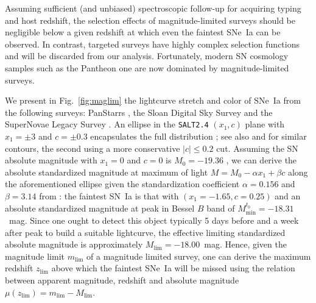 \documentclass[]{aa}
\begin{document}
Assuming sufficient (and unbiased) spectroscopic follow-up for acquiring typing
and host redshift, the selection effects of magnitude-limited surveys should be
negligible below a given redshift at which even the faintest SNe~Ia can be
observed. In contrast, targeted surveys have highly complex selection functions
and will be discarded from our analysis. Fortunately, modern SN cosmology
samples such as the Pantheon one are now dominated by magnitude-limited surveys.

We present in Fig.~\ref{fig:maglim} the lightcurve stretch and color of SNe~Ia
from the following surveys: PanStarrs \citep[PS1][]{rest2014}, the Sloan Digital
Sky Survey \citep[SDSS][]{frieman2008} and the SuperNovae Legacy Survey
\citep[SNLS][]{astier2006}. An ellipse in the \textsc{\texttt{SALT2.4}} $(x_1,
c)$ plane with $x_1 = \pm 3$ and $c = \pm 0.3$ encapsulates the full
distribution \citep{guy2007,betoule2014}; see also \citet{bazin2011} and
\citet{campbell2013} for similar contours, the second using a more conservative
$|c| \leq 0.2$ cut. Assuming the SN absolute magnitude with $x_1=0$ and $c=0$ is
$M_0=-19.36$ \citep{kessler2009,scolnic2014}, we can derive the absolute
standardized magnitude at maximum of light $M = M_0 - \alpha x_1 + \beta c$
along the aforementioned ellipse given the standardization coefficient
$\alpha=0.156$ and $\beta=3.14$ from \cite{scolnic2018a}: the faintest SN~Ia is
that with $(x_1=-1.65, c=0.25)$ and an absolute standardized magnitude at peak
in Bessel $B$ band of $M^{t_0}_{\min} = -18.31$~mag. Since one ought to detect
this object typically 5 days before and a week after peak to build a suitable
lightcurve, the effective limiting standardized absolute magnitude is
approximately $M_{\lim} = -18.00$~mag. Hence, given the magnitude limit
$m_{\lim}$ of a magnitude limited survey, one can derive the maximum redshift
$z_{\lim}$ above which the faintest SNe~Ia will be missed using the relation
between apparent magnitude, redshift and absolute magnitude $\mu(z_{\lim}) =
m_{\lim} - M_{\lim}$.
\end{document}
